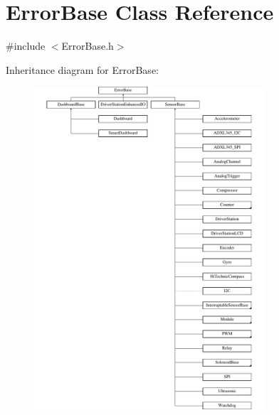 \hypertarget{classErrorBase}{\section{\-Error\-Base \-Class \-Reference}
\label{classErrorBase}
}


{\ttfamily \#include $<$\-Error\-Base.\-h$>$}

\-Inheritance diagram for \-Error\-Base\-:\begin{figure}[H]
\begin{center}
\leavevmode
\includegraphics[height=12.000000cm]{classErrorBase}
\end{center}
\end{figure}
